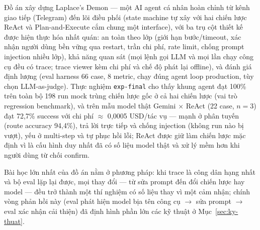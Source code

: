 Đồ án xây dựng Laplace's Demon --- một AI agent cá nhân hoàn chỉnh từ kênh
giao tiếp (Telegram) đến lõi điều phối (state machine tự xây với hai chiến
lược ReAct và Plan-and-Execute cắm chung một interface), với ba trụ cột thiết
kế được hiện thực hóa nhất quán: an toàn theo lớp (giới hạn bước/timeout,
xác nhận người dùng bền vững qua restart, trần chi phí, rate limit, chống
prompt injection nhiều lớp), khả năng quan sát (mọi lệnh gọi LLM và mọi lần
chạy công cụ đều có trace; trace viewer kèm chi phí và chế độ phát lại
offline), và đánh giá định lượng (eval harness 66 case, 8 metric, chạy đúng
agent loop production, tùy chọn LLM-as-judge). Thực nghiệm
\texttt{exp-final} cho thấy khung agent đạt 100\% trên toàn bộ 198 run
mock trùng chiến lược gốc ở cả hai chiến lược (vai trò regression
benchmark), và trên mẫu model thật Gemini $\times$ ReAct (22 case,
$n=3$) đạt 72{,}7\% success với chi phí $\approx$ 0{,}0005 USD/tác vụ ---
mạnh ở phân tuyến (route accuracy 94{,}4\%), trả lời trực tiếp và chống
injection (không run nào bị vượt), yếu ở multi-step và tự phục hồi lỗi;
ReAct được giữ làm chiến lược mặc định vì là cấu hình duy nhất đã có số
liệu model thật và xử lý mềm hơn khi người dùng từ chối confirm.

Bài học lớn nhất của đồ án nằm ở phương pháp: khi trace là công dân hạng
nhất và bộ eval lặp lại được, mọi thay đổi --- từ sửa prompt đến đổi chiến
lược hay model --- đều trở thành một thí nghiệm có số liệu thay vì một cảm
nhận; chính vòng phản hồi này (eval phát hiện model bịa tên công cụ $\to$
sửa prompt $\to$ eval xác nhận cải thiện) đã định hình phần lớn các kỹ thuật
ở Mục~\ref{sec:ky-thuat}.
